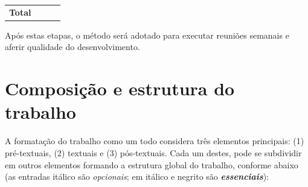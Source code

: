 \begin{table}[]
\begin{tabular}{@{}llll@{}}
            &                                             &                                             &                                             \\ \midrule
        \multicolumn{1}{|l|}{\textbf{Total}}                                                                            & \multicolumn{1}{l|}{}                       & \multicolumn{1}{l|}{}                       & \multicolumn{1}{l|}{}                       \\ \bottomrule
    \end{tabular}
\end{table}

Após estas etapas, o método será adotado para executar reuniões semanais e aferir qualidade do desenvolvimento.


\section{Composição e estrutura do trabalho}

A formatação do trabalho como um todo considera três elementos principais: 
(1) pré-textuais, (2) textuais e (3) pós-textuais. Cada um destes, pode se 
subdividir em outros elementos formando a estrutura global do trabalho, 
conforme abaixo (as entradas itálico são \textit{opcionais}; em itálico e
negrito são \textbf{\textit{essenciais}}):

